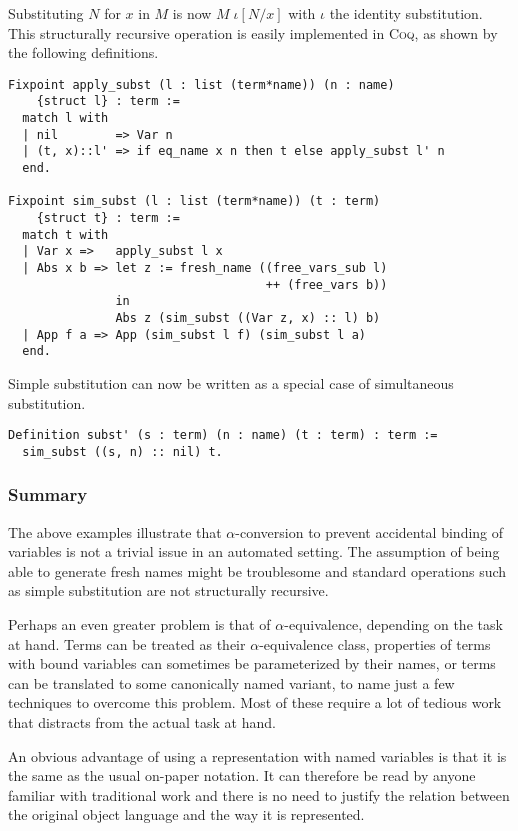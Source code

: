 \documentclass[a4paper,11pt]{article}
\newcommand{\name}[1]{\textsc{#1}\xspace}
\def\Coq{\name{Coq}}
\begin{document}
Substituting $N$ for $x$ in $M$ is now $M \; \iota [N/x]$ with $\iota$
the identity substitution.
This structurally recursive operation is easily implemented in \Coq, as
shown by the following definitions.
\begin{lstlisting}
Fixpoint apply_subst (l : list (term*name)) (n : name)
    {struct l} : term :=
  match l with
  | nil        => Var n
  | (t, x)::l' => if eq_name x n then t else apply_subst l' n
  end.

Fixpoint sim_subst (l : list (term*name)) (t : term)
    {struct t} : term :=
  match t with
  | Var x =>   apply_subst l x
  | Abs x b => let z := fresh_name ((free_vars_sub l)
                                    ++ (free_vars b))
               in
               Abs z (sim_subst ((Var z, x) :: l) b)
  | App f a => App (sim_subst l f) (sim_subst l a)
  end.
\end{lstlisting}
Simple substitution can now be written as a special case of
simultaneous substitution.
\begin{lstlisting}
Definition subst' (s : term) (n : name) (t : term) : term :=
  sim_subst ((s, n) :: nil) t.
\end{lstlisting}

\subsubsection*{Summary}

The above examples illustrate that $\alpha$-conversion to prevent
accidental binding of variables is not a trivial issue in an automated
setting.
The assumption of being able to generate fresh names might be troublesome
and standard operations such as simple substitution are not structurally
recursive.

Perhaps an even greater problem is that of $\alpha$-equivalence, depending
on the task at hand.
Terms can be treated as their $\alpha$-equivalence class, properties of
terms with bound variables can sometimes be parameterized by their names,
or terms can be translated to some canonically named variant, to name just
a few techniques to overcome this problem.
Most of these require a lot of tedious work that distracts from the actual
task at hand.

An obvious advantage of using a representation with named variables is
that it is the same as the usual on-paper notation.
It can therefore be read by anyone familiar with traditional work and there
is no need to justify the relation between the original object language and
the way it is represented.
\end{document}
